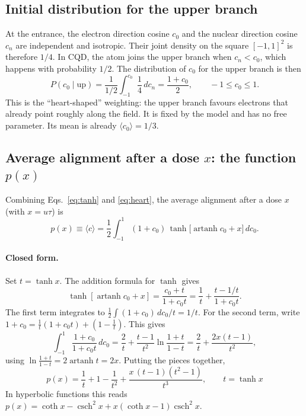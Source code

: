\documentclass[11pt,a4paper]{article}
\newcommand{\artanh}{\operatorname{artanh}}
\newcommand{\csch}{\operatorname{csch}}
\begin{document}
\subsection{Initial distribution for the upper branch}
\label{sec:branch}
At the entrance, the electron direction cosine $c_0$ and the nuclear direction cosine $c_n$ are independent and isotropic. Their joint density on the square $[-1,1]^2$ is therefore $1/4$. In CQD, the atom joins the upper branch when $c_n < c_0$, which happens with probability $1/2$. The distribution of $c_0$ for the upper branch is then
\begin{equation}
P(c_0 \mid \text{up}) = \frac{1}{1/2}\int_{-1}^{c_0}\frac14\,dc_n = \frac{1+c_0}{2},
\qquad -1\le c_0\le 1 .
\label{eq:heart}
\end{equation}
This is the ``heart-shaped'' weighting: the upper branch favours electrons that already point roughly along the field. It is fixed by the model and has no free parameter. Its mean is already $\langle c_0\rangle = 1/3$.

\subsection{Average alignment after a dose $x$: the function $p(x)$}
\label{sec:p}
Combining Eqs.~\eqref{eq:tanh} and \eqref{eq:heart}, the average alignment after a dose $x$ (with $x=u\tau$) is
\begin{equation}
p(x) \equiv \langle c\rangle = \frac12\int_{-1}^{1}(1+c_0)\,\tanh\!\big[\artanh c_0 + x\big]\,dc_0 .
\label{eq:pint}
\end{equation}

\paragraph{Closed form.} Set $t = \tanh x$. The addition formula for $\tanh$ gives
\[
\tanh[\artanh c_0 + x] = \frac{c_0 + t}{1 + c_0 t} = \frac1t + \frac{t - 1/t}{1 + c_0 t}.
\]
The first term integrates to $\tfrac12\int(1+c_0)\,dc_0 / t = 1/t$. For the second term, write $1+c_0 = \tfrac1t(1+c_0t) + (1-\tfrac1t)$. This gives
\[
\int_{-1}^{1}\frac{1+c_0}{1+c_0t}\,dc_0 = \frac2t + \frac{t-1}{t^2}\ln\frac{1+t}{1-t} = \frac2t + \frac{2x(t-1)}{t^2},
\]
using $\ln\frac{1+t}{1-t} = 2\artanh t = 2x$. Putting the pieces together,
\begin{equation}
\boxed{\;p(x) = \frac1t + 1 - \frac{1}{t^2} + \frac{x\,(t-1)(t^2-1)}{t^3},\qquad t=\tanh x\;}
\label{eq:pclosed}
\end{equation}
In hyperbolic functions this reads $p(x) = \coth x - \csch^2 x + x(\coth x - 1)\csch^2 x$.
\end{document}
